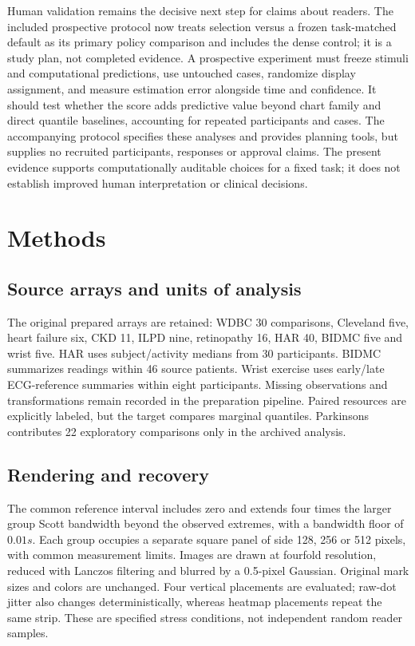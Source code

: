 \documentclass[11pt]{article}
\begin{document}
Human validation remains the decisive next step for claims about readers. The included prospective protocol now treats selection versus a frozen task-matched default as its primary policy comparison and includes the dense control; it is a study plan, not completed evidence. A prospective experiment must freeze stimuli and computational predictions, use untouched cases, randomize display assignment, and measure estimation error alongside time and confidence. It should test whether the score adds predictive value beyond chart family and direct quantile baselines, accounting for repeated participants and cases. The accompanying protocol specifies these analyses and provides planning tools, but supplies no recruited participants, responses or approval claims. The present evidence supports computationally auditable choices for a fixed task; it does not establish improved human interpretation or clinical decisions.

\section*{Methods}
\subsection*{Source arrays and units of analysis}
The original prepared arrays are retained: WDBC 30 comparisons, Cleveland five, heart failure six, CKD 11, ILPD nine, retinopathy 16, HAR 40, BIDMC five and wrist five. HAR uses subject/activity medians from 30 participants. BIDMC summarizes readings within 46 source patients. Wrist exercise uses early/late ECG-reference summaries within eight participants.\cite{pimentel2017,jarchi2017} Missing observations and transformations remain recorded in the preparation pipeline. Paired resources are explicitly labeled, but the target compares marginal quantiles. Parkinsons contributes 22 exploratory comparisons only in the archived analysis.

\subsection*{Rendering and recovery}
The common reference interval includes zero and extends four times the larger group Scott bandwidth beyond the observed extremes, with a bandwidth floor of $0.01s$. Each group occupies a separate square panel of side 128, 256 or 512 pixels, with common measurement limits. Images are drawn at fourfold resolution, reduced with Lanczos filtering and blurred by a 0.5-pixel Gaussian. Original mark sizes and colors are unchanged. Four vertical placements are evaluated; raw-dot jitter also changes deterministically, whereas heatmap placements repeat the same strip. These are specified stress conditions, not independent random reader samples.
\end{document}
